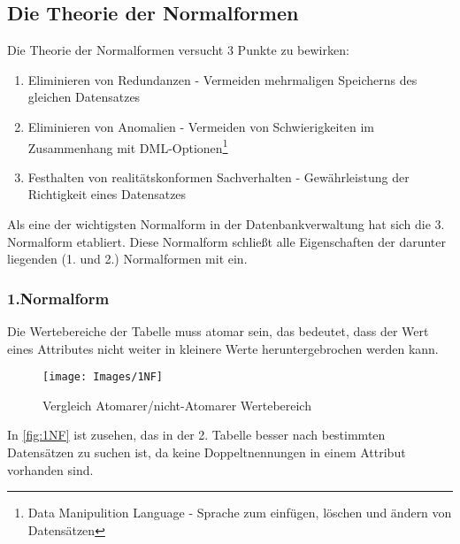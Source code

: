 \subsection{Die Theorie der Normalformen}
Die Theorie der Normalformen versucht 3 Punkte zu bewirken:
\begin{enumerate}
	\item {Eliminieren von Redundanzen - Vermeiden mehrmaligen Speicherns des gleichen Datensatzes}
	\item {Eliminieren von Anomalien - Vermeiden von Schwierigkeiten im Zusammenhang mit DML-Optionen\footnote{Data Manipulition Language - Sprache zum einfügen, löschen und ändern von Datensätzen}}
	\item {Festhalten von realitätskonformen Sachverhalten - Gewährleistung der Richtigkeit eines Datensatzes}
\end{enumerate}
Als eine der wichtigsten Normalform in der Datenbankverwaltung hat sich die 3. Normalform etabliert. Diese Normalform schließt alle Eigenschaften der darunter liegenden (1. und 2.) Normalformen mit ein. 
\subsubsection*{1.Normalform}
Die Wertebereiche der Tabelle muss atomar sein, das bedeutet, dass der Wert eines Attributes nicht weiter in kleinere Werte heruntergebrochen werden kann.
\begin{figure}[H]
	\begin{center}
		\texttt{[image: Images/1NF]}
		\caption{Vergleich Atomarer/nicht-Atomarer Wertebereich\cite{Knott:Normalformen}}
		\label{fig:1NF}
	\end{center}
\end{figure}
In \autoref{fig:1NF} ist zusehen, das in der 2. Tabelle besser nach bestimmten Datensätzen zu suchen ist, da keine Doppeltnennungen in einem Attribut vorhanden sind.\newpage


